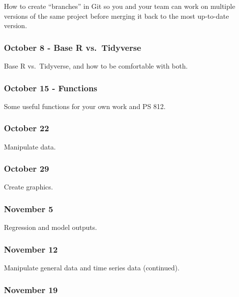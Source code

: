 \documentclass[11pt,]{article}
\begin{document}
How to create ``branches'' in Git so you and your team can work on
multiple versions of the same project before merging it back to the most
up-to-date version.

\hypertarget{october-8---base-r-vs.-tidyverse}{%
\subsubsection{October 8 - Base R
vs.~Tidyverse}\label{october-8---base-r-vs.-tidyverse}}

Base R vs.~Tidyverse, and how to be comfortable with both.

\hypertarget{october-15---functions}{%
\subsubsection{October 15 - Functions}\label{october-15---functions}}

Some useful functions for your own work and PS 812.

\hypertarget{october-22}{%
\subsubsection{October 22}\label{october-22}}

Manipulate data.

\hypertarget{october-29}{%
\subsubsection{October 29}\label{october-29}}

Create graphics.

\hypertarget{november-5}{%
\subsubsection{November 5}\label{november-5}}

Regression and model outputs.

\hypertarget{november-12}{%
\subsubsection{November 12}\label{november-12}}

Manipulate general data and time series data (continued).

\hypertarget{november-19}{%
\subsubsection{November 19}\label{november-19}}
\end{document}
